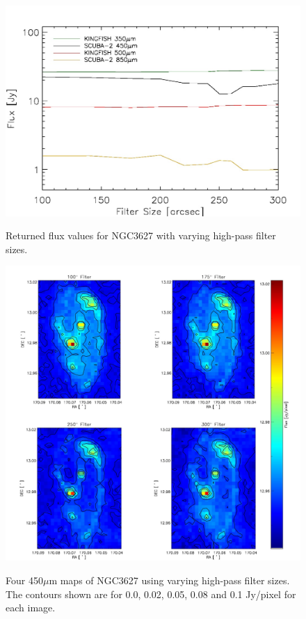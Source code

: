 \begin{figure}
  \centering
  \includegraphics[scale=0.65]{obs_imgs/flux_line.jpeg}
  \label{fig:filt_lines}
  \caption[Flux Values vs  High-Pass Filter Sizes]{Returned flux values for NGC3627 with varying high-pass filter sizes.}
\end{figure}

\begin{figure}
  \centering
  \includegraphics[scale=0.5]{obs_imgs/450_comparison_4.jpeg}
  \label{fig:450_flt}
  \caption[450$\mu$m High-Pass Filter Images]{Four 450$\mu$m maps of NGC3627 using varying high-pass filter sizes.  The contours shown are for 0.0, 0.02, 0.05, 0.08 and 0.1 Jy/pixel for each image.}
\end{figure}

